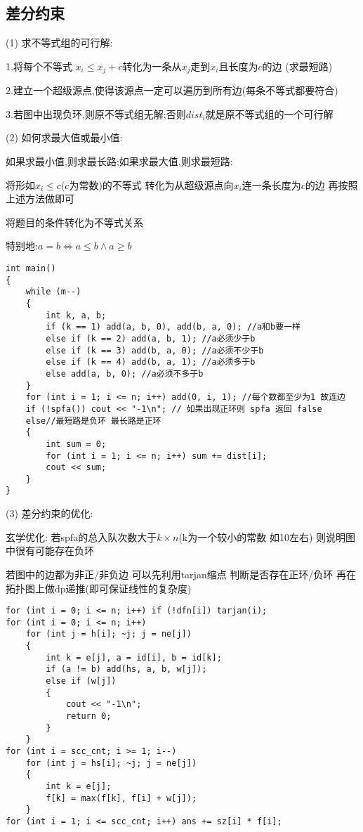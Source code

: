 \documentclass[a4paper,fontset=none]{ctexart}
\begin{document}
\subsection{差分约束}
(1) 求不等式组的可行解:

1.将每个不等式 $x_i\leqslant x_j+c$转化为一条从$x_j$走到$x_i$且长度为$c$的边 (求最短路)

2.建立一个超级源点,使得该源点一定可以遍历到所有边(每条不等式都要符合)

3.若图中出现负环,则原不等式组无解;否则$dist_i$就是原不等式组的一个可行解

(2) 如何求最大值或最小值:

如果求最小值,则求最长路;如果求最大值,则求最短路:

将形如$x_i\leqslant c$($c$为常数)的不等式 转化为从超级源点向$x_i$连一条长度为$c$的边 再按照上述方法做即可

将题目的条件转化为不等式关系

特别地:$a=b\Leftrightarrow a\leqslant b\land a\geqslant b$

\begin{verbatim}
int main()
{
    while (m--)
    {
        int k, a, b;
        if (k == 1) add(a, b, 0), add(b, a, 0); //a和b要一样
        else if (k == 2) add(a, b, 1); //a必须少于b
        else if (k == 3) add(b, a, 0); //a必须不少于b
        else if (k == 4) add(b, a, 1); //a必须多于b
        else add(a, b, 0); //a必须不多于b
    }
    for (int i = 1; i <= n; i++) add(0, i, 1); //每个数都至少为1 故连边
    if (!spfa()) cout << "-1\n"; // 如果出现正环则 spfa 返回 false
    else//最短路是负环 最长路是正环
    {
        int sum = 0;
        for (int i = 1; i <= n; i++) sum += dist[i];
        cout << sum;
    }
}
\end{verbatim}

(3) 差分约束的优化:

玄学优化: 若spfa的总入队次数大于$k\times n$(k为一个较小的常数 如10左右)  则说明图中很有可能存在负环

若图中的边都为非正/非负边  可以先利用tarjan缩点 判断是否存在正环/负环 再在拓扑图上做dp递推(即可保证线性的复杂度)

\begin{verbatim}
for (int i = 0; i <= n; i++) if (!dfn[i]) tarjan(i);
for (int i = 0; i <= n; i++)
    for (int j = h[i]; ~j; j = ne[j])
    {
        int k = e[j], a = id[i], b = id[k];
        if (a != b) add(hs, a, b, w[j]);
        else if (w[j])
        {
            cout << "-1\n";
            return 0;
        }
    }
for (int i = scc_cnt; i >= 1; i--)
    for (int j = hs[i]; ~j; j = ne[j])
    {
        int k = e[j];
        f[k] = max(f[k], f[i] + w[j]);
    }
for (int i = 1; i <= scc_cnt; i++) ans += sz[i] * f[i];
\end{verbatim}
\end{document}
